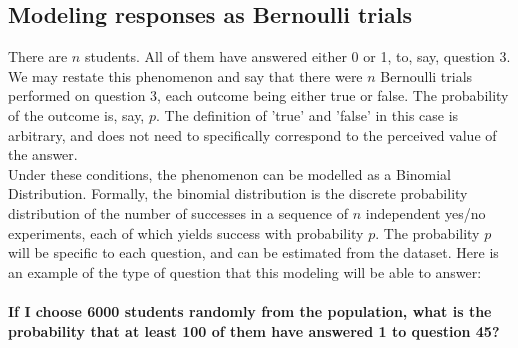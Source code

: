 \documentclass[10pt]{article}
\begin{document}
\subsection{Modeling responses as Bernoulli trials}
There are $n$ students. All of them have answered either 0 or 1, to, say, question 3. We may restate this phenomenon and say that there were $n$ Bernoulli trials performed on question 3, each outcome being either true or false. The probability of the outcome is, say, $p$. The definition of 'true' and 'false' in this case is arbitrary, and does not need to specifically correspond to the perceived value of the answer.\\
Under these conditions, the phenomenon can be modelled as a Binomial Distribution. Formally, the binomial distribution is the discrete probability distribution of the number of successes in a sequence of $n$ independent yes/no experiments, each of which yields success with probability $p$.
The probability $p$ will be specific to each question, and can be estimated from the dataset.
Here is an example of the type of question that this modeling will be able to answer:\\\\
\textbf{If I choose 6000 students randomly from the population, what is the probability that at least 100 of them have answered 1 to question 45?
}
\end{document}
